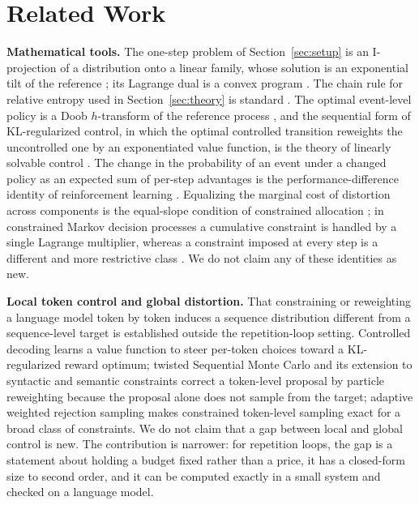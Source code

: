 \section{Related Work}\label{sec:related}

\textbf{Mathematical tools.} The one-step problem of Section~\ref{sec:setup} is an I-projection of a distribution onto a linear family, whose solution is an exponential tilt of the reference \cite{csiszar1975idivergence}; its Lagrange dual is a convex program \cite{boyd2004convex}. The chain rule for relative entropy used in Section~\ref{sec:theory} is standard \cite{cover2006elements}. The optimal event-level policy is a Doob $h$-transform of the reference process \cite{doob1957conditional}, and the sequential form of KL-regularized control, in which the optimal controlled transition reweights the uncontrolled one by an exponentiated value function, is the theory of linearly solvable control \cite{kappen2005linear,todorov2007linearly}. The change in the probability of an event under a changed policy as an expected sum of per-step advantages is the performance-difference identity of reinforcement learning \cite{kakade2002approximately}. Equalizing the marginal cost of distortion across components is the equal-slope condition of constrained allocation \cite{cover2006elements,boyd2004convex}; in constrained Markov decision processes a cumulative constraint is handled by a single Lagrange multiplier, whereas a constraint imposed at every step is a different and more restrictive class \cite{altman1999constrained,achiam2017constrained}. We do not claim any of these identities as new.

\textbf{Local token control and global distortion.} That constraining or reweighting a language model token by token induces a sequence distribution different from a sequence-level target is established outside the repetition-loop setting. Controlled decoding \cite{mudgal2024controlled} learns a value function to steer per-token choices toward a KL-regularized reward optimum; twisted Sequential Monte Carlo \cite{zhao2024twisted} and its extension to syntactic and semantic constraints \cite{loula2025syntactic} correct a token-level proposal by particle reweighting because the proposal alone does not sample from the target; adaptive weighted rejection sampling \cite{lipkin2025awrs} makes constrained token-level sampling exact for a broad class of constraints. We do not claim that a gap between local and global control is new. The contribution is narrower: for repetition loops, the gap is a statement about holding a budget fixed rather than a price, it has a closed-form size to second order, and it can be computed exactly in a small system and checked on a language model.

